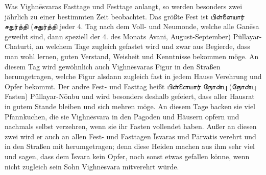 \documentclass{article}
\newcommand{\TamilText}[1]{\texttamil{#1}}
\newcommand{\tam}[1]{\TamilText{#1}}
\begin{document}
Was Vighn\={e}svaras Fasttage und Festtage anlangt, so werden besonders zwei jährlich zu einer bestimmten Zeit beobachtet. Das größte Fest ist \tam{பிள்ளையார்} \tam{சதுர்த்தி} (\tam{சதுர்த்தி} jeder 4. Tag nach dem Voll- und Neumonde, welche alle Gan\={e}sa geweiht sind, dann speziell der 4. des Monats Avani, August-September) Püllayar-Chaturti, an welchem Tage zugleich gefastet wird und zwar aus Begierde, dass man wohl lernen, guten Verstand, Weisheit und Kenntnisse bekommen möge. An diesem Tag wird gewöhnlich auch Vighn\={e}svaras Figur in den Straßen herumgetragen, welche Figur alsdann zugleich fast in jedem Hause Verehrung und Opfer bekommt. Der andre Fest- und Fasttag heißt \tam{பிள்ளையார்} \tam{நோன்பு} (\tam{நோன்பு} Fasten) Püllayar-N\={o}nbu und wird besonders deshalb gefeiert, dass aller Hausrat in gutem Stande bleiben und sich mehren möge. An diesem Tage backen sie viel Pfannkuchen, die sie Vighn\={e}svara in den Pagoden und Häusern opfern und nachmals selbst verzehren, wenn sie ihr Fasten vollendet haben. Außer an diesen zwei wird er auch an allen Fest- und Fasttagen \={I}svaras und P\={a}rvatis verehrt und in den Straßen mit herumgetragen; denn diese Heiden machen aus ihm sehr viel und sagen, dass dem \={I}svara kein Opfer, noch sonst etwas gefallen könne, wenn nicht zugleich sein Sohn Vighn\={e}svara mitverehrt würde.
\end{document}
